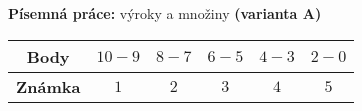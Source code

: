 \begin{center}
\large \textbf{Písemná práce:} výroky a množiny \textbf{(varianta A)}

\normalsize
{}\qquad
{}\qquad
{}
\end{center}
\begin{table}[h]
\centering

\begin{tabular}{c|c|c|c|c|c}
    \textbf{Body}   & $10-9$ & $8-7$ & $6-5$ & $4-3$ & $2-0$ \\ \hline
    \textbf{Známka} & $1$     & $2$   & $3 $  & $4$   & $5$
\end{tabular}
\end{table}



